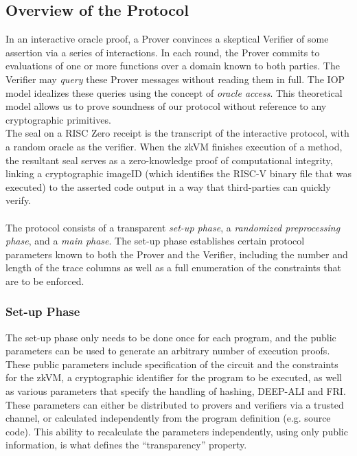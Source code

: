 \documentclass[10pt,letterpaper,titlepage]{article}
\theoremstyle{definition}
\begin{document}
\subsection{Overview of the Protocol}
In an interactive oracle proof, a Prover convinces a skeptical Verifier of some assertion via a series of interactions. 
In each round, the Prover commits to evaluations of one or more functions over a domain known to both parties. 
The Verifier may \textit{query} these Prover messages without reading them in full. 
The IOP model idealizes these queries using the concept of \textit{oracle access}. 
This theoretical model allows us to prove soundness of our protocol without reference to any cryptographic primitives.%
\\
The seal on a RISC Zero receipt is the transcript of the interactive protocol, with a random oracle as the verifier.
When the zkVM finishes execution of a method, the resultant seal serves as a zero-knowledge proof of computational integrity, linking a cryptographic imageID (which identifies the RISC-V binary file that was executed) to the asserted code output in a way that third-parties can quickly verify.\\
\\
The protocol consists of a transparent \textit{set-up phase}, a \textit{randomized preprocessing phase}, and a \textit{main phase}. 
The set-up phase establishes certain protocol parameters known to both the Prover and the Verifier, including the number and length of the trace columns as well as a full enumeration of the constraints that are to be enforced.

\subsubsection{Set-up Phase}
The set-up phase only needs to be done once for each program, and the public parameters can be used to generate an arbitrary number of execution proofs. 
These public parameters include specification of the circuit and the constraints for the zkVM, a cryptographic identifier for the program to be executed, as well as various parameters that specify the handling of hashing, DEEP-ALI and FRI.  
These parameters can either be distributed to provers and verifiers via a trusted channel, or calculated independently from the program definition (e.g. source code).
This ability to recalculate the parameters independently, using only public information, is what defines the ``transparency'' property.
\end{document}
